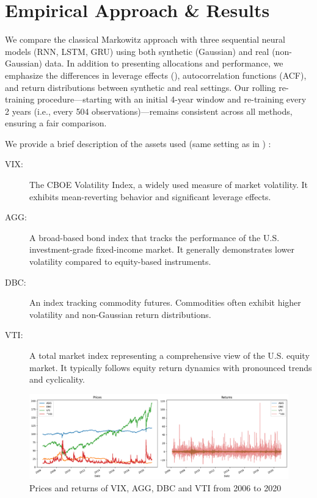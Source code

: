 \documentclass[11pt]{article}
\begin{document}
\section{Empirical Approach \& Results}

We compare the classical Markowitz approach with three sequential neural models (RNN, LSTM, GRU) using both synthetic (Gaussian) and real (non-Gaussian) data. In addition to presenting allocations and performance, we emphasize the differences in leverage effects (\cite{Bouchaud_2001}), autocorrelation functions (ACF), and return distributions between synthetic and real settings. Our rolling re-training procedure—starting with an initial 4-year window and re-training every 2 years (i.e., every 504 observations)—remains consistent across all methods, ensuring a fair comparison.

We provide a brief description of the assets used (same setting as in \cite{zhang2020deep}) :
\begin{description}
  \item[VIX:] The CBOE Volatility Index, a widely used measure of market volatility. It exhibits mean-reverting behavior and significant leverage effects.
  \item[AGG:] A broad-based bond index that tracks the performance of the U.S. investment-grade fixed-income market. It generally demonstrates lower volatility compared to equity-based instruments.
  \item[DBC:] An index tracking commodity futures. Commodities often exhibit higher volatility and non-Gaussian return distributions.
  \item[VTI:] A total market index representing a comprehensive view of the U.S. equity market. It typically follows equity return dynamics with pronounced trends and cyclicality.
\end{description}

\begin{figure}[h]
    \centering
    \includegraphics[width=0.8
    \linewidth]{images/prices_returns_assets.png}
    \caption{Prices and returns of VIX, AGG, DBC and VTI from 2006 to 2020}
    \label{fig:enter-label}
\end{figure}
\end{document}
